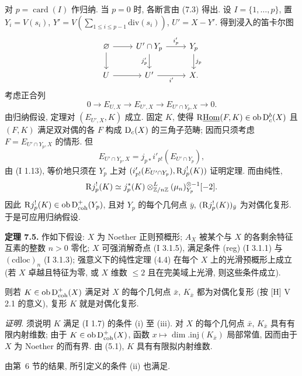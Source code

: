 对 $p=\operatorname{card}(I)$ 作归纳. 当 $p=0$ 时, 各断言由 (7.3) 得出. 设 $I=\{1,\ldots,p\}$, 置 $Y_i=V(s_i)$, $Y'=V(\sum_{1\leq i\leq p-1}\mathrm{div}(s_i))$, $U'=X-Y'$. 得到浸入的笛卡尔图
\[
\begin{tikzcd}
\varnothing \arrow[r] \arrow[d] & U'\cap Y_p \arrow[r,"i'_p"] \arrow[d,"j'_p"'] & Y_p \arrow[d,"j_p"]\\
U \arrow[r] & U' \arrow[r,"i'"'] & X.
\end{tikzcd}
\]
考虑正合列
\[
        0\longrightarrow E_{U,X}\longrightarrow E_{U',X}\longrightarrow E_{U'\cap Y_p,X}\longrightarrow0.
\]
由归纳假设, 定理对 $(E_{U',X},K)$ 成立. 固定 $K$, 使得 $\mathrm R\underline{\operatorname{Hom}}(F,K)\in\operatorname{ob}\mathrm{D}_c^b(X)$ 且 $(F,K)$ 满足双对偶的各 $F$ 构成 $\mathrm{D}_c(X)$ 的三角子范畴; 因而只须考虑 $F=E_{U'\cap Y_p,X}$ 的情形. 但
\[
        E_{U'\cap Y_p,X}=j_{p*}i'_{p!}(E_{U'\cap Y_p}),
\]
由 (I 1.13), 等价地只须在 $Y_p$ 上对 $(i'_{p!}(E_{U'\cap Y_p}),\mathrm R j_p^!(K))$ 证明定理. 而由纯性,
\[
        \mathrm R j_p^!(K)\simeq j_p^*(K)\otimes^L_{\mathbb Z/n\mathbb Z}(\mu_n)_{Y_p}^{\otimes -1}[-2].
\]
因此 $\mathrm R j_p^!(K)\in\operatorname{ob}\mathrm{D}^{+}_{\mathrm{coh}}(Y_p)$, 且对 $Y_p$ 的每个几何点 $\bar{y}$, $(\mathrm R j_p^!(K))_{\bar{y}}$ 为对偶化复形. 于是可应用归纳假设.

\textbf{定理 7.5.} 作如下假设: $X$ 为 Noether 正则预概形; $A_X$ 被某个与 $X$ 的各剩余特征互素的整数 $n>0$ 零化; $X$ 可强消解奇点 (I 3.1.5), 满足条件 (reg) (I 3.1.1) 与 $(\mathrm{cdloc})_n$ (I 3.1.3); 强意义下的纯性定理 (4.4) 在每个 $X$ 上的光滑预概形上成立 (若 $X$ 卓越且特征为零, 或 $X$ 维数 $\leq2$ 且在完美域上光滑, 则这些条件成立).

则若 $K\in\operatorname{ob}\mathrm{D}^{+}_{\mathrm{coh}}(X)$ 满足对 $X$ 的每个几何点 $\bar{x}$, $K_{\bar{x}}$ 都为对偶化复形 (按 [H] V 2.1 的意义), 复形 $K$ 就是对偶化复形.

\emph{证明.} 须说明 $K$ 满足 (I 1.7) 的条件 (i) 至 (iii). 对 $X$ 的每个几何点 $\bar{x}$, $K_{\bar{x}}$ 具有有限内射维数; 由于 $K\in\operatorname{ob}\mathrm{D}^{+}_{\mathrm{coh}}(X)$, 函数 $x\mapsto\dim.\mathrm{inj}(K_{\bar{x}})$ 局部常值, 因而由于 $X$ 为 Noether 的而有界. 由 (5.1), $K$ 具有有限拟内射维数.

由第~6 节的结果, 所引定义的条件 (ii) 也满足.

